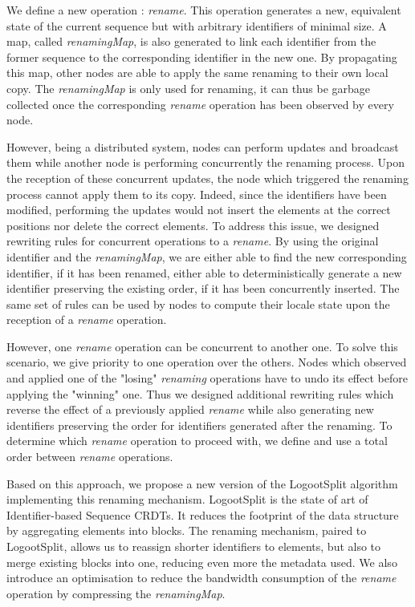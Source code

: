 \documentclass[sigplan]{acmart}
\begin{document}
We define a new operation : \emph{rename}.
This operation generates a new, equivalent state of the current sequence but with arbitrary identifiers of minimal size.
A map, called \emph{renamingMap}, is also generated to link each identifier from the former sequence to the corresponding identifier in the new one.
By propagating this map, other nodes are able to apply the same renaming to their own local copy.
The \emph{renamingMap} is only used for renaming, it can thus be garbage collected once the corresponding \emph{rename} operation has been observed by every node.

However, being a distributed system, nodes can perform updates and broadcast them while another node is performing concurrently the renaming process.
Upon the reception of these concurrent updates, the node which triggered the renaming process cannot apply them to its copy.
Indeed, since the identifiers have been modified, performing the updates would not insert the elements at the correct positions nor delete the correct elements.
To address this issue, we designed rewriting rules for concurrent operations to a \emph{rename}.
By using the original identifier and the \emph{renamingMap}, we are either able to find the new corresponding identifier, if it has been renamed, either able to deterministically generate a new identifier preserving the existing order, if it has been concurrently inserted.
The same set of rules can be used by nodes to compute their locale state upon the reception of a \emph{rename} operation.

However, one \emph{rename} operation can be concurrent to another one.
To solve this scenario, we give priority to one operation over the others.
Nodes which observed and applied one of the "losing" \emph{renaming} operations have to undo its effect before applying the "winning" one.
Thus we designed additional rewriting rules which reverse the effect of a previously applied \emph{rename} while also generating new identifiers preserving the order for identifiers generated after the renaming.
To determine which \emph{rename} operation to proceed with, we define and use a total order between \emph{rename} operations.

Based on this approach, we propose a new version of the LogootSplit \cite{AndreCollaborateCom2013} algorithm implementing this renaming mechanism.
LogootSplit is the state of art of Identifier-based Sequence \acp{CRDT}.
It reduces the footprint of the data structure by aggregating elements into blocks.
The renaming mechanism, paired to LogootSplit, allows us to reassign shorter identifiers to elements, but also to merge existing blocks into one, reducing even more the metadata used.
We also introduce an optimisation to reduce the bandwidth consumption of the \emph{rename} operation by compressing the \emph{renamingMap}.
\end{document}
